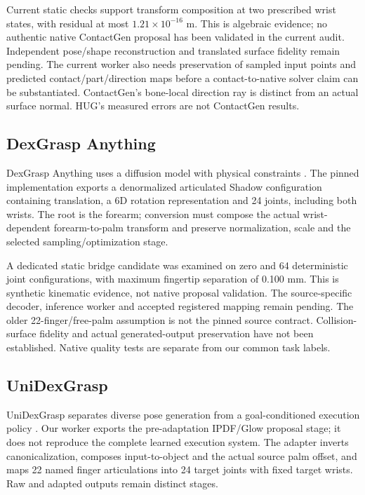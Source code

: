 \documentclass[10pt,letterpaper]{article}
\begin{document}
Current static checks support transform composition at two prescribed wrist
states, with residual at most $1.21\times10^{-16}$ m. This is algebraic evidence;
no authentic native ContactGen proposal has been validated in the current audit.
Independent pose/shape reconstruction and translated surface fidelity remain
pending. The current worker also needs preservation of sampled input points and
predicted contact/part/direction maps before a contact-to-native solver claim
can be substantiated. ContactGen's bone-local direction ray is distinct from an
actual surface normal. HUG's measured errors are not ContactGen results.

\subsection{DexGrasp Anything}
DexGrasp Anything uses a diffusion model with physical constraints
\cite{dga}. The pinned implementation exports a denormalized articulated
Shadow configuration containing translation, a 6D rotation representation and
24 joints, including both wrists. The root is the forearm; conversion must
compose the actual wrist-dependent forearm-to-palm transform and preserve
normalization, scale and the selected sampling/optimization stage.

A dedicated static bridge candidate was examined on zero and 64 deterministic
joint configurations, with maximum fingertip separation of 0.100 mm. This is
synthetic kinematic evidence, not native proposal validation. The source-specific
decoder, inference worker and accepted registered mapping remain pending.
The older 22-finger/free-palm assumption is not the pinned source contract.
Collision-surface fidelity and actual generated-output preservation have not
been established. Native quality tests are separate from our common task labels.

\subsection{UniDexGrasp}
UniDexGrasp separates diverse pose generation from a goal-conditioned execution
policy \cite{unidex}. Our worker exports the pre-adaptation IPDF/Glow proposal
stage; it does not reproduce the complete learned execution system. The adapter
inverts canonicalization, composes input-to-object and the actual source palm
offset, and maps 22 named finger articulations into 24 target joints with fixed
target wrists. Raw and adapted outputs remain distinct stages.
\end{document}
